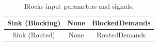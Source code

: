\begin{table}[H]
\begin{tabular}{|c|c|c|}
		Sink (Blocking)                                                       & None                                                                                                                       & BlockedDemands                                                               \\ \hline
		Sink (Routed)                                                         & None                                                                                                                       & RoutedDemands                                                                \\ \hline
	\end{tabular}
	\caption{Blocks input parameters and signals.}
	\label{blocks_input}
\end{table}

